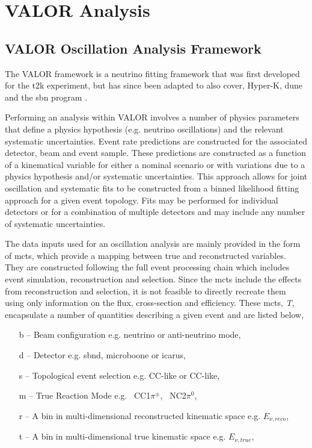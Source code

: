 \chapter{VALOR Analysis}
\label{chap:VALOR}

\section{VALOR Oscillation Analysis Framework}\label{sec:VALOR_framework}

The VALOR framework is a neutrino fitting framework that was first developed for the \gls{t2k} experiment, but has since been adapted to also cover, Hyper-K, \gls{dune} and the \gls{sbn} program \cite{VALOR}.

Performing an analysis within VALOR involves a number of physics parameters that define a physics hypothesis (e.g. neutrino oscillations) and the relevant systematic uncertainties. Event rate predictions are constructed for the associated detector, beam and event sample. These predictions are constructed as a function of a kinematical variable for either a nominal scenario or with variations due to a physics hypothesis and/or systematic uncertainties. This approach allows for joint oscillation and systematic fits to be constructed from a binned likelihood fitting approach for a given event topology. Fits may be performed for individual detectors or for a combination of multiple detectors and may include any number of systematic uncertainties. 

The data inputs used for an oscillation analysis are mainly provided in the form of \glspl{mct}, which provide a mapping between true and reconstructed variables. They are constructed following the full event processing chain which includes event simulation, reconstruction and selection. Since the \glspl{mct} include the effects from reconstruction and selection, it is not feasible to directly recreate them using only information on the flux, cross-section and efficiency. These \glspl{mct}, \textit{T}, encapsulate a number of quantities describing a given event and are listed below,

\begin{itemize}
    \item[b] -- Beam configuration e.g. neutrino or anti-neutrino mode,
    \item[d] -- Detector e.g. \gls{sbnd}, \gls{microboone} or \gls{icarus},
    \item[s] -- Topological event selection e.g. \nue CC-like or \numu CC-like,
    \item[m] -- True Reaction Mode e.g. \nue~CC1$\pi^{\pm}$, \nue~NC2$\pi^0$,
    \item[r] -- A bin in multi-dimensional reconstructed kinematic space e.g. $E_{\nu, reco}$,
    \item[t] -- A bin in multi-dimensional true kinematic space e.g. $E_{\nu, true}$,
\end{itemize}

